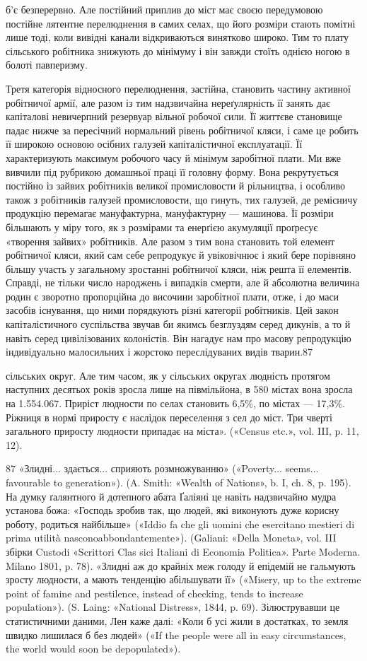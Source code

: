 б’є безперервно. Але постійний приплив до міст має своєю передумовою постійне лятентне перелюднення
в самих селах, що його розміри стають помітні лише тоді, коли вивідні канали відкриваються винятково
широко. Тим то плату сільського робітника
знижують до мінімуму і він завжди стоїть однією ногою в болоті павперизму.

Третя категорія відносного перелюднення, застійна, становить частину активної робітничої армії, але
разом із тим надзвичайна нереґулярність її занять дає капіталові невичерпний резервуар вільної
робочої сили. Її життєве становище падає нижче за
пересічний нормальний рівень робітничої кляси, і саме це робить її широкою основою осібних галузей
капіталістичної експлуатації. Її характеризують максимум робочого часу й мінімум заробітної плати.
Ми вже вивчили під рубрикою домашньої праці її головну форму. Вона рекрутується постійно із зайвих
робітників великої промисловости й рільництва, і особливо також з робітників галузей промисловости,
що гинуть, тих галузей, де ремісничу продукцію перемагає мануфактурна, мануфактурну — машинова. Її
розміри більшають у міру того, як з розмірами та енерґією акумуляції проґресує «творення зайвих»
робітників. Але разом з тим вона становить той елемент робітничої кляси, який сам себе репродукує й
увіковічнює і який бере порівняно більшу участь у загальному зростанні робітничої кляси, ніж решта
її елементів. Справді, не тільки число народжень і випадків смерти, але й абсолютна величина родин є
зворотно пропорційна до височини заробітної плати, отже, і до маси засобів існування, що ними
порядкують різні категорії робітників. Цей закон капіталістичного суспільства звучав би якимсь
безглуздям серед дикунів, а то й навіть серед цивілізованих колоністів. Він нагадує нам про масову
репродукцію індивідуально малосильних і жорстоко переслідуваних видів тварин.87

сільських округ. Але тим часом, як у сільських округах людність протягом наступних десятьох років
зросла лише на півмільйона, в 580 містах вона зросла на 1.554.067. Приріст людности по селах
становить 6,5\%, по містах — 17,3\%. Ріжниця в нормі приросту є наслідок переселення з сел до міст.
Три чверті загального приросту людности припадає на міста». («Census etc.», vol. III, p. 11, 12).

87 «Злидні... здається... сприяють розмножуванню» («Poverty... seems... favourable to generation»).
(A. Smith: «Wealth of Nations», b. I, ch. 8, p. 195). На думку ґалянтного й дотепного абата Ґаліяні
це навіть надзвичайно мудра установа божа: «Господь зробив так, що людей, які виконують дуже корисну
роботу, родиться найбільше» («Iddio fa che
gli uomini che esercitano mestieri di prima utilità nasconoabbondantemente»). (Galiani: «Della
Moneta», vol. III збірки Custodi «Scrittori Clas sici Italiani di Economia Politica». Parte Moderna.
Milano 1801, p. 78). «Злидні аж до крайніх меж голоду й епідемій не гальмують зросту людности, а
мають тенденцію абільшувати її» («Misery, up to the extreme point of famine and pestilence, instead
of checking, tends to increase population»).
(S. Laing: «National Distress», 1844, p. 69). Зілюструвавши це статистичними даними, Лен каже далі:
«Коли б усі жили в достатках, то земля швидко лишилася б без людей» («If the people were all in easy
circumstances, the world would soon be depopulated»).
